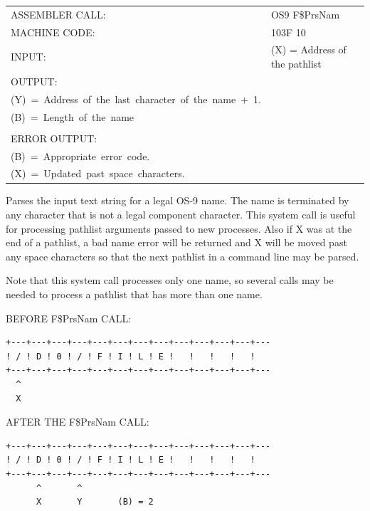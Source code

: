 \documentclass[
]{article}
\newcounter{none} %
\begin{document}
{\def\LTcaptype{none} %
\begin{longtable}[]{@{}
  >{\raggedright\arraybackslash}p{}
  >{\raggedright\arraybackslash}p{}@{}}
\toprule\noalign{}
\endhead
\bottomrule\noalign{}
\endlastfoot
ASSEMBLER CALL: & OS9 F\$PrsNam \\
MACHINE CODE: & 103F 10 \\
INPUT: & (X) = Address of the pathlist \\
OUTPUT: & \begin{minipage}[t]{\linewidth}\raggedright
(X)~=~Updated~past~the~optional~``/''\\
(Y)~=~Address~of~the~last~character~of~the~name~+~1.\\
(B)~=~Length~of~the~name\\
\end{minipage} \\
ERROR OUTPUT: & \begin{minipage}[t]{\linewidth}\raggedright
(CC)~=~C~bit~set.\\
(B)~=~Appropriate~error~code.\\
(X)~=~Updated~past~space~characters.
\end{minipage} \\
\end{longtable}
}

Parses the input text string for a legal OS-9 name. The name is
terminated by any character that is not a legal component character.
This system call is useful for processing pathlist arguments passed to
new processes. Also if X was at the end of a pathlist, a bad name error
will be returned and X will be moved past any space characters so that
the next pathlist in a command line may be parsed.

Note that this system call processes only one name, so several calls may
be needed to process a pathlist that has more than one name.

BEFORE F\$PrsNam CALL:

\begin{verbatim}
+---+---+---+---+---+---+---+---+---+---+---+---+---
! / ! D ! 0 ! / ! F ! I ! L ! E !   !   !   !   !
+---+---+---+---+---+---+---+---+---+---+---+---+---
  ^
  X
\end{verbatim}

AFTER THE F\$PrsNam CALL:

\begin{verbatim}
+---+---+---+---+---+---+---+---+---+---+---+---+---
! / ! D ! 0 ! / ! F ! I ! L ! E !   !   !   !   !
+---+---+---+---+---+---+---+---+---+---+---+---+---
      ^       ^
      X       Y       (B) = 2
\end{verbatim}
\end{document}
